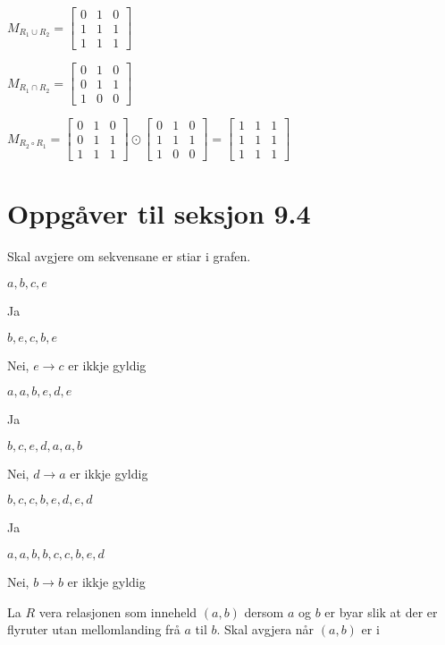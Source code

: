 \documentclass[a4paper, 11pt]{article}
\newcommand{\Themecolor}{Mahogany} %
\newcommand{\Themetext}[1]{\textcolor{\Themecolor}{#1}}
\newcommand{\Task}[1]{\vspace{3mm}\noindent {\tt \Themetext{#1:}}}
\newcommand{\MajorTask}[1]{
  \vspace{5mm}
  \reversemarginpar
  \marginnote{\large\bfseries \Themetext{#1}}
}
\begin{document}
\Task{a} \(M_{R_1 \cup R_2} = \begin{bmatrix}
  0 & 1 & 0 \\ 1 & 1 & 1 \\ 1 & 1 & 1
\end{bmatrix}\)


\Task{b} \(M_{R_1 \cap R_2} = \begin{bmatrix}
  0 & 1 & 0 \\ 0 & 1 & 1 \\ 1 & 0 & 0
\end{bmatrix}\)


\Task{c} \(M_{R_2 \circ R_1} = \begin{bmatrix}
    0 & 1 & 0 \\
    0 & 1 & 1 \\
    1 & 1 & 1
  \end{bmatrix} \odot \begin{bmatrix}
    0 & 1 & 0 \\
    1 & 1 & 1 \\
    1 & 0 & 0
  \end{bmatrix} = \begin{bmatrix}
    1 & 1 & 1 \\
    1 & 1 & 1 \\
    1 & 1 & 1
\end{bmatrix}\)


\newpage
\section*{Oppgåver til seksjon 9.4}
\MajorTask{16}
\noindent Skal avgjere om sekvensane er stiar i grafen.

\Task{a} \(a,b,c,e\)

\noindent Ja


\Task{b} \(b,e,c,b,e\)

\noindent Nei, \(e \rightarrow c\) er ikkje gyldig


\Task{c}  \(a,a,b,e,d,e\)

\noindent Ja


\Task{d} \(b,c,e,d,a,a,b\)

\noindent Nei, \(d \rightarrow a\) er ikkje gyldig


\Task{e} \(b,c,c,b,e,d,e,d\)

\noindent Ja


\Task{f} \(a,a,b,b,c,c,b,e,d\)

\noindent Nei, \(b \rightarrow b\) er ikkje gyldig


\MajorTask{20}
\noindent La \(R\) vera relasjonen som inneheld \((a,b)\) dersom \(a\)
og \(b\) er byar slik at der er flyruter utan mellomlanding frå \(a\) til
\(b\). Skal avgjera når \((a,b)\) er i
\end{document}
